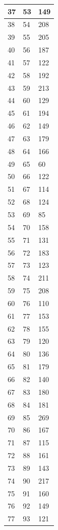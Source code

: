 \begin{tabular}{p{}p{}p{}}
\hline
37 & 53 & 149 \\
\hline
38 & 54 & 208 \\
\hline
39 & 55 & 205 \\
\hline
40 & 56 & 187 \\
\hline
41 & 57 & 122 \\
\hline
42 & 58 & 192 \\
\hline
43 & 59 & 213 \\
\hline
44 & 60 & 129 \\
\hline
45 & 61 & 194 \\
\hline
46 & 62 & 149 \\
\hline
47 & 63 & 179 \\
\hline
48 & 64 & 166 \\
\hline
49 & 65 & 60 \\
\hline
50 & 66 & 122 \\
\hline
51 & 67 & 114 \\
\hline
52 & 68 & 124 \\
\hline
53 & 69 & 85 \\
\hline
54 & 70 & 158 \\
\hline
55 & 71 & 131 \\
\hline
56 & 72 & 183 \\
\hline
57 & 73 & 123 \\
\hline
58 & 74 & 211 \\
\hline
59 & 75 & 208 \\
\hline
60 & 76 & 110 \\
\hline
61 & 77 & 153 \\
\hline
62 & 78 & 155 \\
\hline
63 & 79 & 120 \\
\hline
64 & 80 & 136 \\
\hline
65 & 81 & 179 \\
\hline
66 & 82 & 140 \\
\hline
67 & 83 & 180 \\
\hline
68 & 84 & 181 \\
\hline
69 & 85 & 269 \\
\hline
70 & 86 & 167 \\
\hline
71 & 87 & 115 \\
\hline
72 & 88 & 161 \\
\hline
73 & 89 & 143 \\
\hline
74 & 90 & 217 \\
\hline
75 & 91 & 160 \\
\hline
76 & 92 & 149 \\
\hline
77 & 93 & 121 \\

\end{tabular}
